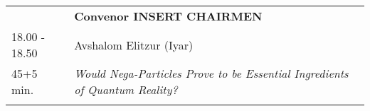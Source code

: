 \begin{longtable}{p{3cm}p{13cm}}
&\hfill {\bf Convenor INSERT CHAIRMEN }\\ 
18.00 - 18.50 & Avshalom Elitzur (Iyar)\\ 
45+5 min. & {\it Would Nega-Particles Prove to be Essential Ingredients of Quantum Reality?}\\ 
 & \\ 
\end{longtable}

